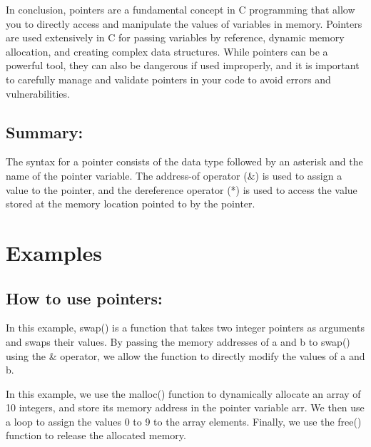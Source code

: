 \documentclass[
	12pt, %
]{fphw}
\begin{document}
In conclusion, pointers are a fundamental concept in C programming that allow 
you to directly access and manipulate the values of variables in memory. 
Pointers are used extensively in C for passing variables by reference, 
dynamic memory allocation, and creating complex data structures. While 
pointers can be a powerful tool, they can also be dangerous if used improperly,
and it is important to carefully manage and validate pointers in your code to 
avoid errors and vulnerabilities.\\


\subsection*{Summary:}
The syntax for a pointer consists of the data type followed by an asterisk
and the name of the pointer variable. The address-of operator (\&) is used 
to assign a value to the pointer, and the dereference operator (*) is 
used to access the value stored at the memory location pointed to by the 
pointer.

\newpage
\section*{Examples}

\subsection*{How to use pointers:}

\begin{problem}
	
In this example, swap() is a function that takes two integer pointers as 
arguments and swaps their values. By passing the memory addresses of a and b 
to swap() using the \& operator, we allow the function to directly modify the 
values of a and b.
\end{problem}

\begin{problem}
	
In this example, we use the malloc() function to dynamically allocate an array 
of 10 integers, and store its memory address in the pointer variable arr. We 
then use a loop to assign the values 0 to 9 to the array elements. Finally, we
use the free() function to release the allocated memory.
\end{problem}
\end{document}
